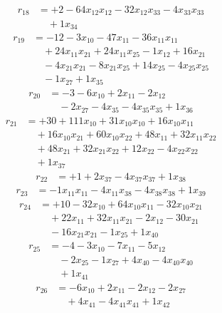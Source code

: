 \[\begin{aligned}
r_{18} &= + 2 - 64 x_{12} x_{12} - 32 x_{12} x_{33} - 4 x_{33} x_{33} \\
 &\quad + 1 x_{34}
\end{aligned}\]
\[\begin{aligned}
r_{19} &= - 12 - 3 x_{10} - 47 x_{11} - 36 x_{11} x_{11} \\
 &\quad + 24 x_{11} x_{21} + 24 x_{11} x_{25} - 1 x_{12} + 16 x_{21} \\
 &\quad - 4 x_{21} x_{21} - 8 x_{21} x_{25} + 14 x_{25} - 4 x_{25} x_{25} \\
 &\quad - 1 x_{27} + 1 x_{35}
\end{aligned}\]
\[\begin{aligned}
r_{20} &= - 3 - 6 x_{10} + 2 x_{11} - 2 x_{12} \\
 &\quad - 2 x_{27} - 4 x_{35} - 4 x_{35} x_{35} + 1 x_{36}
\end{aligned}\]
\[\begin{aligned}
r_{21} &= + 30 + 111 x_{10} + 31 x_{10} x_{10} + 16 x_{10} x_{11} \\
 &\quad + 16 x_{10} x_{21} + 60 x_{10} x_{22} + 48 x_{11} + 32 x_{11} x_{22} \\
 &\quad + 48 x_{21} + 32 x_{21} x_{22} + 12 x_{22} - 4 x_{22} x_{22} \\
 &\quad + 1 x_{37}
\end{aligned}\]
\[\begin{aligned}
r_{22} &= + 1 + 2 x_{37} - 4 x_{37} x_{37} + 1 x_{38}
\end{aligned}\]
\[\begin{aligned}
r_{23} &= - 1 x_{11} x_{11} - 4 x_{11} x_{38} - 4 x_{38} x_{38} + 1 x_{39}
\end{aligned}\]
\[\begin{aligned}
r_{24} &= + 10 - 32 x_{10} + 64 x_{10} x_{11} - 32 x_{10} x_{21} \\
 &\quad + 22 x_{11} + 32 x_{11} x_{21} - 2 x_{12} - 30 x_{21} \\
 &\quad - 16 x_{21} x_{21} - 1 x_{25} + 1 x_{40}
\end{aligned}\]
\[\begin{aligned}
r_{25} &= - 4 - 3 x_{10} - 7 x_{11} - 5 x_{12} \\
 &\quad - 2 x_{25} - 1 x_{27} + 4 x_{40} - 4 x_{40} x_{40} \\
 &\quad + 1 x_{41}
\end{aligned}\]
\[\begin{aligned}
r_{26} &= - 6 x_{10} + 2 x_{11} - 2 x_{12} - 2 x_{27} \\
 &\quad + 4 x_{41} - 4 x_{41} x_{41} + 1 x_{42}
\end{aligned}\]
